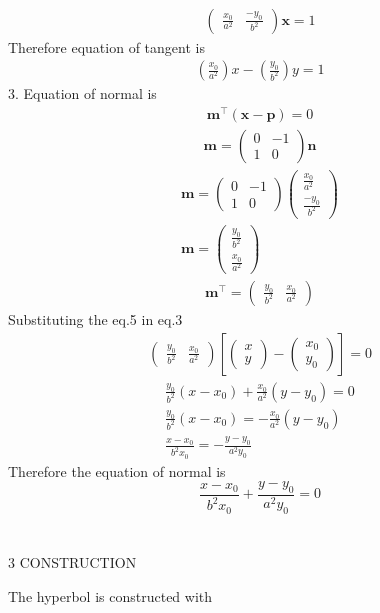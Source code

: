 \documentclass[a4paper,10pt]{report}
\newcommand{\myvec}[1]{\ensuremath{\begin{pmatrix}#1\end{pmatrix}}}
\let\vec\mathbf
\providecommand{\sbrak}[1]{\ensuremath{{}\left[#1\right]}}
\begin{document}
\begin{multicols}{2}
\begin{gather*}
\end{gather*}
\begin{align}
\myvec{\frac{x_0}{a^{2}} & \frac{-y_0}{b^{2}}}\vec{x} = 1 
\end{align}
Therefore equation of tangent is \begin{align}
 \left( \frac{x_0}{a^{2}} \right)x - \left(\frac{y_0}{b^{2}}\right)y = 1 
\end{align}
3. Equation of normal is 
\begin{gather}
\vec{m}^{\top}(\vec{x-p}) = 0
\end{gather}
\begin{gather}
\vec{m} = \myvec{0 & -1 \\ 1 & 0}\vec{n}
\end{gather}
\begin{gather*}
\vec{m} = \myvec{0 & -1 \\ 1 & 0}\myvec{\frac{x_0}{a^{2}} \\ \frac{-y_0}{b^{2}}}\\
\vec{m} = \myvec{\frac{y_0}{b^{2}} \\ \frac{x_0}{a^{2}}} 
\end{gather*}
\begin{gather}
\vec{m}^{\top} = \myvec{\frac{y_0}{b^{2}} & \frac{x_0}{a^{2}}}
\end{gather}
Substituting the eq.5 in eq.3
\begin{gather}
\myvec{\frac{y_0}{b^{2}} & \frac{x_0}{a^{2}}}  \sbrak{\myvec{x \\ y} - \myvec{x_0 \\ y_0}} = 0
\end{gather}
\begin{gather*}
\frac{y_0}{b^{2}}(x-x_0) + \frac{x_0}{a^{2}}(y-y_0) = 0 \\
\frac{y_0}{b^{2}}(x-x_0) = -\frac{x_0}{a^{2}}(y-y_0) \\
\frac{x-x_0}{b^{2}x_0} = -\frac{y-y_0}{a^{2}y_0}
\end{gather*}
Therefore the equation of normal is $$\frac{x-x_0}{b^{2}x_0}+\frac{y-y_0}{a^{2}y_0} = 0 $$ 
	\vspace{2mm}\\
\vspace{2mm}\\
\centering \large\textsc{3  C}\footnotesize\textsc{ONSTRUCTION}\vspace{5mm}\\
\raggedright\large{The hyperbol is constructed with } 

\end{multicols}
\end{document}
